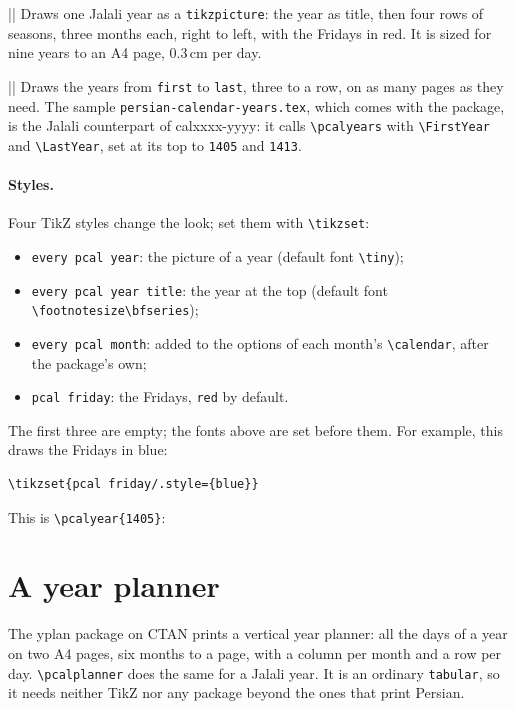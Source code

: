 \documentclass[11pt]{article}
\newcommand\pkg[1]{\textsf{#1}}
\newcommand\cs[1]{\texttt{\textbackslash #1}}
\begin{document}
\macro||
Draws one Jalali year as a \texttt{tikzpicture}: the year as title, then four rows of seasons, three months
each, right to left, with the Fridays in red. It is sized for nine years to an A4 page, 0.3\,cm per day.

\macro||
Draws the years from \texttt{first} to \texttt{last}, three to a row, on as many pages as they need. The
sample \texttt{persian-calendar-years.tex}, which comes with the package, is the Jalali counterpart of
\pkg{calxxxx-yyyy}: it calls \cs{pcalyears} with \cs{FirstYear} and \cs{LastYear}, set at its top to
\texttt{1405} and \texttt{1413}.

\paragraph{Styles.} Four \pkg{TikZ} styles change the look; set them with \cs{tikzset}:
\begin{itemize}
  \item \texttt{every pcal year}: the picture of a year (default font \verb|\tiny|);
  \item \texttt{every pcal year title}: the year at the top (default font \verb|\footnotesize\bfseries|);
  \item \texttt{every pcal month}: added to the options of each month's \cs{calendar}, after the package's own;
  \item \texttt{pcal friday}: the Fridays, \texttt{red} by default.
\end{itemize}
The first three are empty; the fonts above are set before them. For example, this draws the Fridays in
blue:
\begin{verbatim}
\tikzset{pcal friday/.style={blue}}
\end{verbatim}
This is \verb|\pcalyear{1405}|:
\begin{center}
\end{center}

\section{A year planner}\label{sec:yplan}

The \pkg{yplan} package on CTAN prints a vertical year planner: all the days of a year on two A4 pages,
six months to a page, with a column per month and a row per day. \cs{pcalplanner} does the same for a Jalali
year. It is an ordinary \texttt{tabular}, so it needs neither \pkg{TikZ} nor any package beyond the ones
that print Persian.
\end{document}
